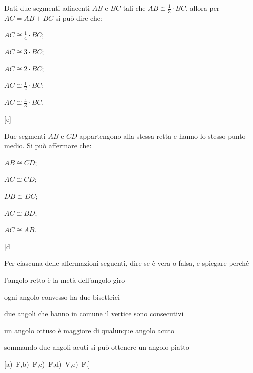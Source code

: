 \begin{esercizio}
\label{ese:1.71}
Dati due segmenti adiacenti $AB$ e $BC$ tali che $AB\cong 
\frac{1}{3}\cdot BC$, allora per $AC=AB+BC$ si può dire che:
\begin{multicols}{3}
\begin{enumeratea}
\item $AC\cong \frac{1}{4}\cdot BC$;
\item $AC\cong 3\cdot BC$;
\item $AC\cong 2\cdot BC$;
\item $AC\cong \frac{1}{2}\cdot BC$;
\item $AC\cong \frac{4}{3}\cdot BC$.
\end{enumeratea}
\end{multicols}
\hfill[e]
\end{esercizio}

\begin{esercizio}
\label{ese:1.72}
Due segmenti $AB$ e $CD$ appartengono alla stessa retta e hanno lo 
stesso punto medio. Si può affermare che:
\begin{multicols}{5}
\begin{enumeratea}
\item $AB\cong CD$;
\item $AC\cong CD$;
\item $DB\cong DC$;
\item $AC\cong BD$;
\item $AC\cong AB$.
\end{enumeratea}
\end{multicols}
\hfill[d]
\end{esercizio}

\begin{esercizio}
\label{ese:1.73}
Per ciascuna delle affermazioni seguenti, dire se è vera o falsa, e 
spiegare perché
\begin{enumeratea}
\item l'angolo retto è la metà dell'angolo giro	
\tab\tab\tab\qquad\boxV\quad\boxF
\item ogni angolo convesso ha due bisettrici		
\tab\tab\tab\qquad\boxV\quad\boxF
\item due angoli che hanno in comune il vertice sono 
consecutivi	\tab\qquad\boxV\quad\boxF
\item un angolo ottuso è maggiore di qualunque angolo acuto	
	\tab\qquad\boxV\quad\boxF
\item sommando due angoli acuti si può ottenere un angolo 
piatto	\tab\qquad\boxV\quad\boxF
\end{enumeratea}
\hfill[a)~F,\quad b)~F,\quad c)~F,\quad d)~V,\quad e)~F.]
\end{esercizio}

